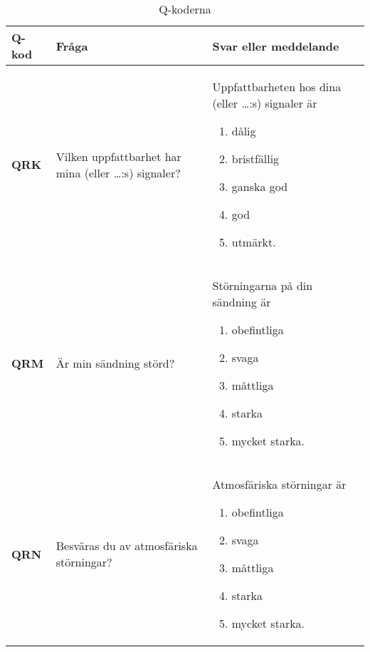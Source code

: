 \begin{table*}
  \begin{threeparttable}
  \label{tab:q-kod}
  \caption{Q-koderna}
  \begin{tabular}{lp{6cm}p{6cm}}
    \textbf{Q-kod} & \textbf{Fråga} & \textbf{Svar eller meddelande} \\
    \hline
    \textbf{QRK} & Vilken uppfattbarhet har mina
                   (eller \dots:s)\tnote{*} signaler? &
                   Uppfattbarheten hos dina (eller \dots:s)\tnote{*} signaler är
                   \vspace{-\topsep}
                   \begin{enumerate}[noitemsep]
                       \item dålig
                       \item bristfällig
                       \item ganska god
                       \item god
                       \item utmärkt.
                   \end{enumerate} \\
    \textbf{QRM} & Är min sändning störd? &
                   Störningarna på din sändning är
                   \vspace{-\topsep}
                   \begin{enumerate}[noitemsep]
                       \item obefintliga
                       \item svaga
                       \item måttliga
                       \item starka
                       \item mycket starka.
                   \end{enumerate} \\
    \textbf{QRN} & Besväras du av atmosfäriska störningar? &
                   Atmosfäriska störningar är
                   \vspace{-\topsep}
                   \begin{enumerate}[noitemsep]
                       \item obefintliga
                       \item svaga
                       \item måttliga
                       \item starka
                       \item mycket starka.

\end{enumerate}
\end{tabular}
\end{threeparttable}
\end{table*}
